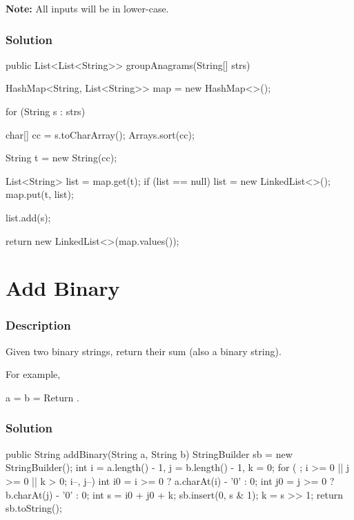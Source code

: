 \textbf{Note:} All inputs will be in lower-case.

\subsubsection{Solution}

\begin{Code}
public List<List<String>> groupAnagrams(String[] strs) {
    HashMap<String, List<String>> map = new HashMap<>();

    for (String s : strs) {
        char[] cc = s.toCharArray();
        Arrays.sort(cc);

        String t = new String(cc);

        List<String> list = map.get(t);
        if (list == null) {
            list = new LinkedList<>();
            map.put(t, list);
        }

        list.add(s);
    }

    return new LinkedList<>(map.values());
}
\end{Code}

\newpage

\section{Add Binary} %

\subsubsection{Description}
Given two binary strings, return their sum (also a binary string).

For example,

a = 
b = 
Return .
\subsubsection{Solution}

\begin{Code}
public String addBinary(String a, String b) {
    StringBuilder sb = new StringBuilder();
    int i = a.length() - 1, j = b.length() - 1, k = 0;
    for ( ; i >= 0 || j >= 0 || k > 0; i--, j--) {
        int i0 = i >= 0 ? a.charAt(i) - '0' : 0;
        int j0 = j >= 0 ? b.charAt(j) - '0' : 0;
        int s = i0 + j0 + k;
        sb.insert(0, s & 1);
        k = s >> 1;
    }
    return sb.toString();
}
\end{Code}

